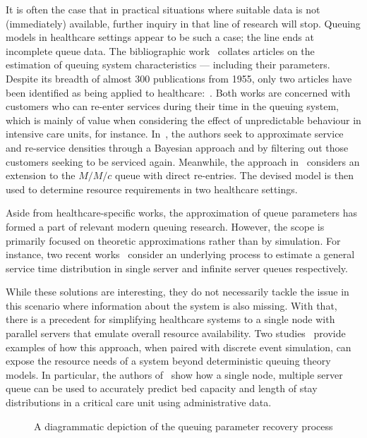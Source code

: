 It is often the case that in practical situations where suitable data is not
(immediately) available, further inquiry in that line of research will stop.
Queuing models in healthcare settings appear to be such a case; the line ends at
incomplete queue data. The bibliographic work~\cite{Asanjarani2017} collates
articles on the estimation of queuing system characteristics --- including their
parameters. Despite its breadth of almost 300 publications from 1955, only two
articles have been identified as being applied to
healthcare:~\cite{Mohammadi2012,Yom2014}. Both works are concerned with
customers who can re-enter services during their time in the queuing system,
which is mainly of value when considering the effect of unpredictable behaviour
in intensive care units, for instance. In~\cite{Mohammadi2012}, the authors seek
to approximate service and re-service densities through a Bayesian approach and
by filtering out those customers seeking to be serviced again. Meanwhile, the
approach in~\cite{Yom2014} considers an extension to the \(M/M/c\) queue with
direct re-entries. The devised model is then used to determine resource
requirements in two healthcare settings.

Aside from healthcare-specific works, the approximation of queue parameters has
formed a part of relevant modern queuing research. However, the scope is
primarily focused on theoretic approximations rather than by simulation. For
instance, two recent works~\cite{Djabali2018,Goldenshluger2016} consider an
underlying process to estimate a general service time distribution in single
server and infinite server queues respectively.

While these solutions are interesting, they do not necessarily tackle the issue
in this scenario where information about the system is also missing. With that,
there is a precedent for simplifying healthcare systems to a single node with
parallel servers that emulate overall resource availability. Two
studies~\cite{Steins2013,Williams2015} provide examples of how this approach,
when paired with discrete event simulation, can expose the resource needs of a
system beyond deterministic queuing theory models. In particular, the authors
of~\cite{Williams2015} show how a single node, multiple server queue can be used
to accurately predict bed capacity and length of stay distributions in a
critical care unit using administrative data.

\begin{figure}
    \centering%
    \resizebox{!}{.9\textheight}{%
        
    }
    \caption{%
        A diagrammatic depiction of the queuing parameter recovery process
    }\label{fig:process}
\end{figure}


